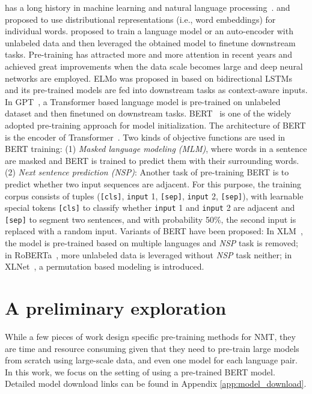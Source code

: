 \documentclass{article} \usepackage{iclr2020_conference,times}
\begin{document}
 has a long history in machine learning and natural language processing~\citep{erhan2009difficulty,erhan2010does}. \citet{mikolov2013distributed} and \citet{pennington2014glove} proposed to use distributional representations (i.e., word embeddings) for individual words. \cite{dai2015semi} proposed to train a language model or an auto-encoder with unlabeled data and then leveraged the obtained model to finetune downstream tasks. Pre-training has attracted more and more attention in recent years and achieved great improvements when the data scale becomes large and deep neural networks are employed. ELMo was proposed in \citet{peters2018deep} based on bidirectional LSTMs and its pre-trained models are fed into downstream tasks as context-aware inputs. In GPT~\citep{radford2018improving}, a Transformer based language model is pre-trained on unlabeled dataset and then finetuned on downstream tasks. BERT~\citep{devlin2018bert} is one of the widely adopted pre-training approach for model initialization. The architecture of BERT is the encoder of Transformer~\citep{vaswani2017attention}. Two kinds of objective functions are used in BERT training: (1) {\em Masked language modeling (MLM)}, where  words in a sentence are masked and BERT is trained to predict them with their surrounding words. 
(2) {\em Next sentence prediction (NSP)}: Another task of pre-training BERT is to predict whether two input sequences are adjacent. For this purpose, the training corpus consists of tuples (\texttt{[cls]}, \texttt{input} 1, \texttt{[sep]}, \texttt{input} 2, \texttt{[sep]}), with learnable special tokens \texttt{[cls]} to classify whether \texttt{input} 1 and \texttt{input} 2 are adjacent and \texttt{[sep]} to segment two sentences, and with probability 50\%, the second input is replaced with a random input. Variants of BERT have been proposed: In XLM~\citep{lample2019cross}, the model is pre-trained based on multiple languages and \emph{NSP} task is removed; in RoBERTa~\citep{liu2019roberta}, more unlabeled data is leveraged without {\em NSP} task neither; in XLNet~\citep{yang2019xlnet}, a permutation based modeling is introduced. 

\section{A preliminary exploration}
\label{sec:init_explore}
While a few pieces of work \citep{lample2019cross,song2019mass} design specific pre-training methods for NMT, they are time and resource consuming given that they need to pre-train large models from scratch using large-scale data, and even one model for each language pair. In this work, we focus on the setting of using a pre-trained BERT model. Detailed model download links can be found in Appendix \ref{app:model_download}.
\end{document}
